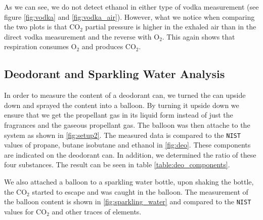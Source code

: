     
    As we can see, we do not detect ethanol in either type of vodka measurement (see figure \ref{fig:vodka} and \ref{fig:vodka_air}).  However, what we notice when comparing the two plots is that CO$_2$ partial pressure is higher in the exhaled air than in the direct vodka measurement and the reverse with O$_2$. This again shows that respiration consumes O$_2$ and produces CO$_2$. 
    
    
    \FloatBarrier
    \newpage
    
    \subsection{Deodorant and Sparkling Water Analysis}
    In order to measure the content of a deodorant can, we turned the can upside down and sprayed the content into a balloon. By turning it upside down we ensure that we get the propellant gas in its liquid form instead of just the fragrances and the gaseous propellant gas. The balloon was then attache to the system as shown in \ref{fig:setup2}.
    The measured data is compared to the \texttt{NIST} values of propane, butane isobutane and ethanol in \ref{fig:deo}. These components are indicated on the deodorant can. In addition, we determined the ratio of these four substances. The result can be seen in table \ref{table:deo_components}. 
    
    We also attached a balloon to a sparkling water bottle, upon shaking the bottle, the CO$_2$ started to escape and was caught in the balloon. The measurement of the balloon content is shown in \ref{fig:sparkling_water} and compared to the \texttt{NIST} values for CO$_2$ and other traces of elements.
    
